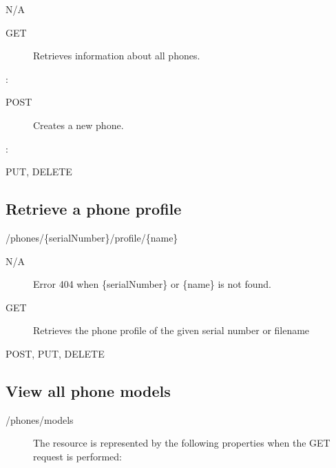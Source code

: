 \documentclass[letterpaper,10pt,english]{sphinxmanual}
\begin{document}
 N/A
\begin{description}
\item[{ GET}] \leavevmode
Retrieves information about all phones.

\end{description}

:

\begin{sphinxVerbatim}[commandchars=\\\{\}]
\end{sphinxVerbatim}
\begin{description}
\item[{ POST}] \leavevmode
Creates a new phone.

\end{description}

:

\begin{sphinxVerbatim}[commandchars=\\\{\}]
\end{sphinxVerbatim}

 PUT, DELETE


\subsection{Retrieve a phone profile}
\label{\detokenize{restapi:retrieve-a-phone-profile}}
 /phones/\{serialNumber\}/profile/\{name\}

 N/A
\begin{description}
\item[{}] \leavevmode
Error 404 when \{serialNumber\} or \{name\} is not found.

\item[{ GET}] \leavevmode
Retrieves the phone profile of the given serial number or filename

\end{description}

 POST, PUT, DELETE


\subsection{View all phone models}
\label{\detokenize{restapi:view-all-phone-models}}
 /phones/models
\begin{description}
\item[{}] \leavevmode
The resource is represented by the following properties when the GET request is performed:

\end{description}
\end{document}
